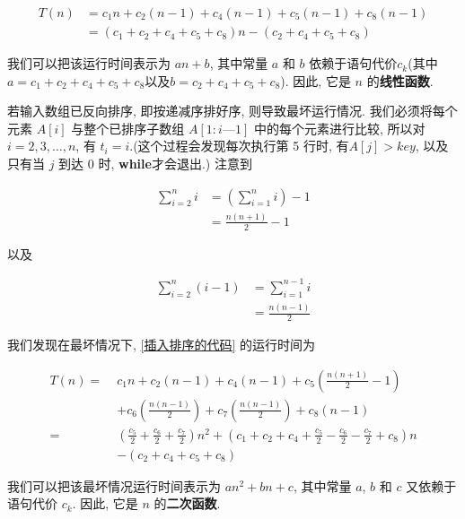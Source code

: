 \documentclass[oneside,10pt,fontset=none]{ctexbook}
\numberwithin{definition}{chapter}
\numberwithin{theorem}{chapter}
\numberwithin{lemma}{chapter}
\begin{document}
\begin{equation}\begin{aligned}
T(n) &= c_1n + c_2(n-1) + c_4(n-1) + c_5(n-1) + c_8(n-1) \\
     &= (c_1+c_2+c_4+c_5+c_8)n - (c_2+c_4+c_5+c_8)
\end{aligned}\end{equation}

我们可以把该运行时间表示为 $an+b$, 其中常量 $a$ 和 $b$ 依赖于语句代价$c_k$(其中$a=c_1+c_2+c_4+c_5+c_8\text{以及}b=c_2+c_4+c_5+c_8$). 因此, 它是 $n$ 的\textbf{线性函数}.

若输入数组已反向排序, 即按递减序排好序, 则导致最坏运行情况. 我们必须将每个元素 $A[i]$ 与整个已排序子数组 $A[1:i—1]$ 中的每个元素进行比较, 所以对 $i=2,3,\dots,n$, 有 $t_i=i$.(这个过程会发现每次执行第 5 行时, 有$A[j]>key$, 以及只有当 $j$ 到达 0 时, \textbf{while}才会退出.) 注意到

\begin{equation*}\begin{split}
\sum_{i=2}^{n}i &= (\sum_{i=1}^{n}i) - 1 \\
                &= \frac{n(n+1)}{2} - 1
\end{split}\end{equation*}

以及

\begin{equation*}\begin{split}
\sum_{i=2}^{n}(i-1) &= \sum_{i=1}^{n-1}i \\
                    &= \frac{n(n-1)}{2}
\end{split}\end{equation*}

我们发现在最坏情况下, \ref{插入排序的代码} 的运行时间为

\begin{equation}\begin{aligned}
T(n) =\; &c_1n + c_2(n-1) + c_4(n-1) + c_5(\frac{n(n+1)}{2}-1) \\
&+c_6(\frac{n(n-1)}{2})+c_7(\frac{n(n-1)}{2})+c_8(n-1) \\
=\; &(\frac{c_5}{2}+\frac{c_6}{2}+\frac{c_7}{2})n^2 + (c_1+c_2+c_4+\frac{c_5}{2}-\frac{c_6}{2}-\frac{c_7}{2}+c_8)n \\
&-(c_2+c_4+c_5+c_8)
\end{aligned}\end{equation}

我们可以把该最坏情况运行时间表示为 $an^2+bn+c$, 其中常量 $a$, $b$ 和 $c$ 又依赖于语句代价 $c_k$. 因此, 它是 $n$ 的\textbf{二次函数}.
\end{document}
